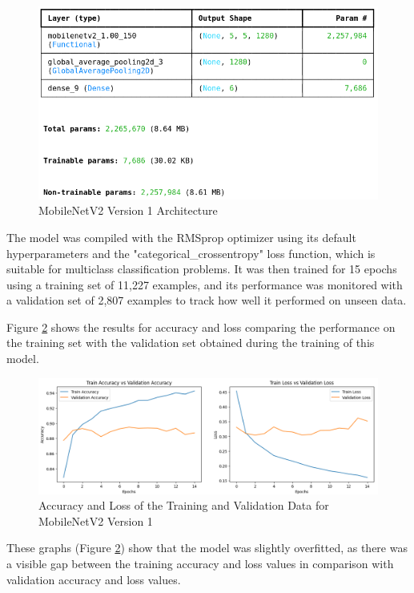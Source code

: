 \documentclass[conference]{IEEEtran}
\begin{document}
\begin{figure}[H]
    \centering
    \includegraphics[width=1\linewidth]{images/arch1MobileNetV2.png}
    \caption{MobileNetV2 Version 1 Architecture}
    \label{fig:arch1MobileNetV2}
\end{figure}

The model was compiled with the RMSprop optimizer using its default hyperparameters and the "categorical\_crossentropy" loss function, which is suitable for multiclass classification problems. It was then trained for 15 epochs using a training set of 11,227 examples, and its performance was monitored with a validation set of 2,807 examples to track how well it performed on unseen data.

Figure \ref{fig:Acc&LossMobileNetV2_1} shows the results for accuracy and loss comparing the performance on the training set with the validation set obtained during the training of this model. 

\begin{figure}[H]
    \centering
    \includegraphics[width=1\linewidth]{images/accAndLossMobileNetV2_1.png}
    \caption{Accuracy and Loss of the Training and Validation Data for MobileNetV2 Version 1}
    \label{fig:Acc&LossMobileNetV2_1}
\end{figure}

These graphs (Figure \ref{fig:Acc&LossMobileNetV2_1}) show that the model was slightly overfitted, as there was a visible gap between the training accuracy and loss values in comparison with validation accuracy and loss values.
\end{document}
